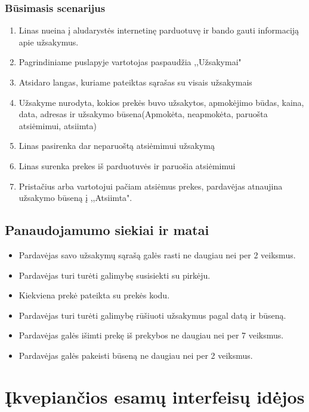 \documentclass[oneside]{VUMIFPSkursinis}
\begin{document}
		\subsubsection{Būsimasis scenarijus}
			\begin{enumerate}
				\item{Linas nueina į aludarystės internetinę parduotuvę ir bando gauti informaciją apie užsakymus.}
				\item{Pagrindiniame puslapyje vartotojas paspaudžia ,,Užsakymai"}
				\item{Atsidaro langas, kuriame pateiktas sąrašas su visais užsakymais}
				\item{Užsakyme nurodyta, kokios prekės buvo užsakytos, apmokėjimo būdas, kaina, data, adresas ir užsakymo būsena(Apmokėta, neapmokėta, paruošta atsiėmimui, atsiimta)}
				\item{Linas pasirenka dar neparuoštą atsiėmimui užsakymą}
				\item{Linas surenka prekes iš parduotuvės ir paruošia atsiėmimui}
				\item{Pristačius arba vartotojui pačiam atsiėmus prekes, pardavėjas atnaujina užsakymo būseną į ,,Atsiimta".}
				\end{enumerate}
	\subsection{Panaudojamumo siekiai ir matai}
		\begin{itemize}
			\item{Pardavėjas savo užsakymų sąrašą galės rasti ne daugiau nei per 2 veiksmus.}
			\item{Pardavėjas turi turėti galimybę susisiekti su pirkėju.}
			\item{Kiekviena prekė pateikta su prekės kodu.}
			\item{Pardavėjas turi turėti galimybę rūšiuoti užsakymus pagal datą ir būseną.}
			\item{Pardavėjas galės išimti prekę iš prekybos ne daugiau nei per 7 veiksmus.}
			\item{Pardavėjas galės pakeisti būseną ne daugiau nei per 2 veiksmus.}
		\end{itemize}
\section{Įkvepiančios esamų interfeisų idėjos}
\end{document}
